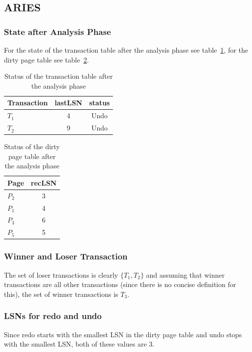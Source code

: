 \documentclass[a4paper,11pt]{article}
\begin{document}
\subsection{ARIES}
\label{sec:ex4}

\subsubsection{State after Analysis Phase}
For the state of the transaction table after the analysis phase see table~\ref{tab:trans}, for the dirty page table see table~\ref{tab:dirt}.

\begin{table}[ht]
  \centering
  \begin{tabular}{l | c | c}
    Transaction & lastLSN & status\\ \hline
    \(T_1\) & 4 & Undo\\
    \(T_2\) & 9 & Undo
  \end{tabular}
  \caption{Status of the transaction table after the analysis phase}
  \label{tab:trans}
\end{table}

\begin{table}[ht]
  \centering
  \begin{tabular}{l | c}
    Page & recLSN\\ \hline
    \(P_2\) & 3\\
    \(P_1\) & 4\\
    \(P_3\) & 6\\
    \(P_5\) & 5
  \end{tabular}
  \caption{Status of the dirty page table after the analysis phase}
  \label{tab:dirt}
\end{table}

\subsubsection{Winner and Loser Transaction}
The set of loser transactions is clearly \(\{T_1, T_2\}\) and assuming that winner transactions are all other transactions (since there is no concise definition for this), the set of winner transactions is \(T_3\).

\subsubsection{LSNs for redo and undo}
Since redo starts with the smallest LSN in the dirty page table and undo stops with the smallest LSN, both of these values are 3.
\end{document}
